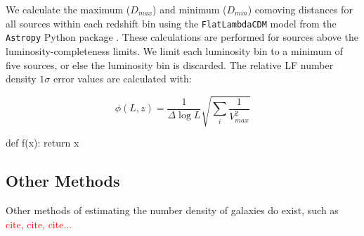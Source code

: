 We calculate the maximum ($D_{max}$) and minimum ($D_{min}$) comoving distances for all sources within each redshift bin using the \texttt{FlatLambdaCDM} model from the \texttt{Astropy} Python package \citep{astropy_collaboration_astropy_2022}. These calculations are performed for sources above the luminosity-completeness limits. We limit each luminosity bin to a minimum of five sources, or else the luminosity bin is discarded. The relative LF number density $1\sigma$ error values are calculated with:

\begin{equation} 
    \label{EQ: Number Density Error}
    \phi(L,z) = \frac{1}{\Delta \log L}\sqrt{\sum_i \frac{1}{V_{max}^2}}
\end{equation}


\begin{python}
    def f(x):
        return x
\end{python}

\subsection{Other Methods}
Other methods of estimating the number density of galaxies do exist, such as \textcolor{red}{cite, cite, cite...}